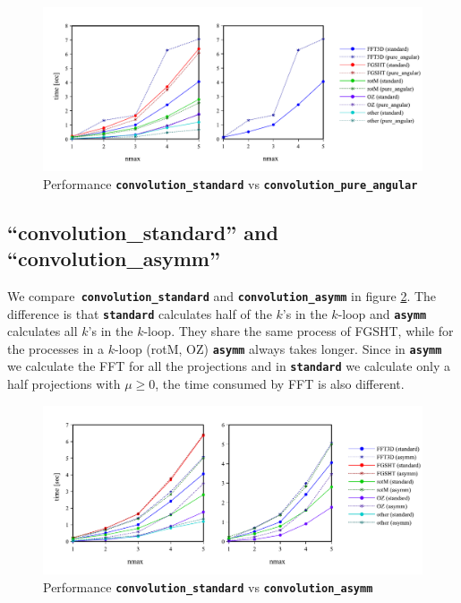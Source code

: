 \begin{figure}[H]
\begin{centering}
\includegraphics[bb=20bp 20bp 667bp 268bp,width=1\columnwidth]{_figure/results/pure_angular}
\par\end{centering}
\caption[Performance comparison of ``convolution\_standard'' and ``convolution\_pure\_angular'']{Performance \texttt{\textbf{convolution\_standard}} vs \texttt{\textbf{convolution\_pure\_angular\label{fig:comparison-pure_angular}}}}
\end{figure}


\subsection{``convolution\_standard'' and ``convolution\_asymm''}

We compare\texttt{\textbf{ convolution\_standard}} and \texttt{\textbf{convolution\_asymm}}
in figure \ref{fig:comparison-asymm}. The difference is that \texttt{\textbf{standard}}
calculates half of the $k$'s in the $k$-loop and \texttt{\textbf{asymm}}
calculates all $k$'s in the $k$-loop. They share the same process
of \acs{FGSHT}, while for the processes in a $k$-loop (rotM, OZ)
\texttt{\textbf{asymm}} always takes longer. Since in \texttt{\textbf{asymm}}
we calculate the \acs{FFT} for all the projections and in \texttt{\textbf{standard}}
we calculate only a half projections with $\mu\geq0$, the time consumed
by \acs{FFT} is also different.

\begin{figure}[H]
\begin{centering}
\includegraphics[bb=20bp 20bp 647bp 268bp,width=1\columnwidth]{_figure/results/asymm}
\par\end{centering}
\caption[Performance comparison of ``convolution\_standard'' and ``convolution\_asymm'']{Performance \texttt{\textbf{convolution\_standard}} vs \texttt{\textbf{convolution\_asymm\label{fig:comparison-asymm}}}}
\end{figure}


